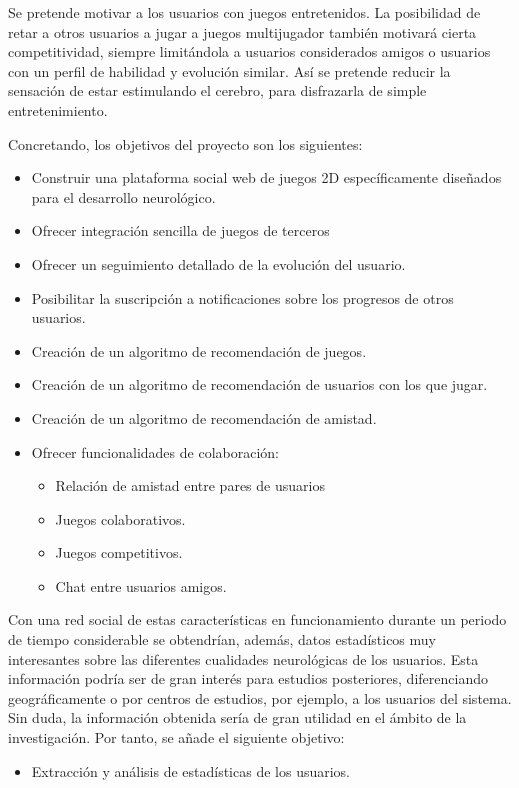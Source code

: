 \documentclass[12pt,a4paper]{article}
\begin{document}
Se pretende motivar a los usuarios con juegos entretenidos. La posibilidad de retar a otros usuarios a jugar a juegos multijugador también motivará cierta competitividad, siempre limitándola a usuarios considerados amigos o usuarios con un perfil de habilidad y evolución similar. Así se pretende reducir la sensación de estar estimulando el cerebro, para disfrazarla de simple entretenimiento.

Concretando, los objetivos del proyecto son los siguientes:

\begin{itemize}
\item Construir una plataforma social web de juegos 2D específicamente diseñados para el desarrollo neurológico.
\item Ofrecer integración sencilla de juegos de terceros
\item Ofrecer un seguimiento detallado de la evolución del usuario.
\item Posibilitar la suscripción a notificaciones sobre los progresos de otros usuarios.
\item Creación de un algoritmo de recomendación de juegos.
\item Creación de un algoritmo de recomendación de usuarios con los que jugar.
\item Creación de un algoritmo de recomendación de amistad.
\item Ofrecer funcionalidades de colaboración:
  \begin{itemize}
  \item Relación de amistad entre pares de usuarios
  \item Juegos colaborativos.
  \item Juegos competitivos.
  \item Chat entre usuarios amigos.
  \end{itemize}
\end{itemize}

Con una red social de estas características en funcionamiento durante un periodo de tiempo considerable se obtendrían, además, datos estadísticos muy interesantes sobre las diferentes cualidades neurológicas de los usuarios. Esta información podría ser de gran interés para estudios posteriores, diferenciando geográficamente o por centros de estudios, por ejemplo, a los usuarios del sistema. Sin duda, la información obtenida sería de gran utilidad en el ámbito de la investigación. Por tanto, se añade el siguiente objetivo:

\begin{itemize}
\item Extracción y análisis de estadísticas de los usuarios.
\end{itemize}
\end{document}
